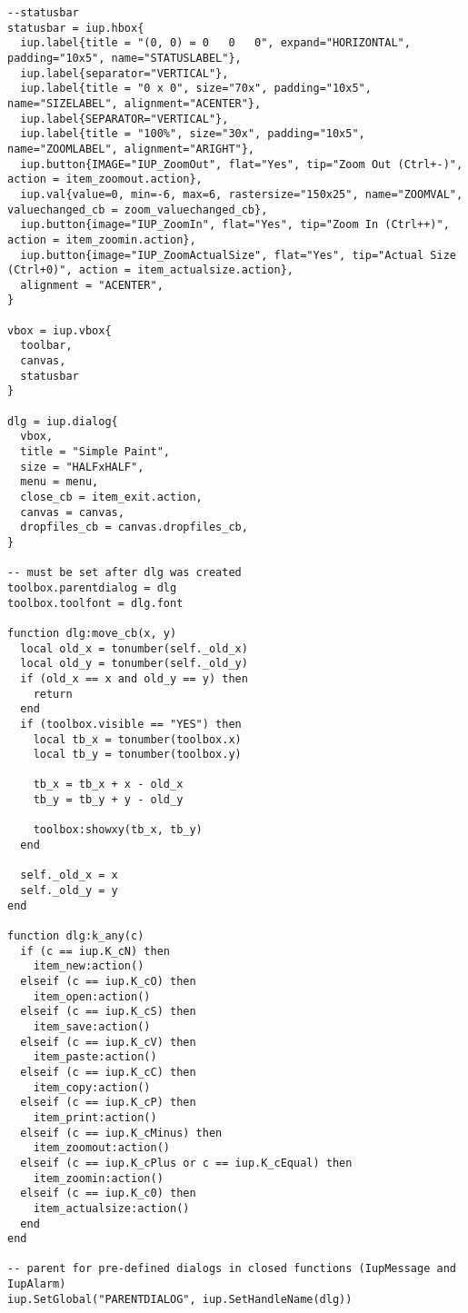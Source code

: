 \documentclass{ctexart}
\begin{document}
\begin{lstlisting}
--statusbar
statusbar = iup.hbox{
  iup.label{title = "(0, 0) = 0   0   0", expand="HORIZONTAL", padding="10x5", name="STATUSLABEL"},
  iup.label{separator="VERTICAL"},
  iup.label{title = "0 x 0", size="70x", padding="10x5", name="SIZELABEL", alignment="ACENTER"},
  iup.label{SEPARATOR="VERTICAL"},
  iup.label{title = "100%", size="30x", padding="10x5", name="ZOOMLABEL", alignment="ARIGHT"},
  iup.button{IMAGE="IUP_ZoomOut", flat="Yes", tip="Zoom Out (Ctrl+-)", action = item_zoomout.action},
  iup.val{value=0, min=-6, max=6, rastersize="150x25", name="ZOOMVAL", valuechanged_cb = zoom_valuechanged_cb},
  iup.button{image="IUP_ZoomIn", flat="Yes", tip="Zoom In (Ctrl++)", action = item_zoomin.action},
  iup.button{image="IUP_ZoomActualSize", flat="Yes", tip="Actual Size (Ctrl+0)", action = item_actualsize.action},
  alignment = "ACENTER",
}

vbox = iup.vbox{
  toolbar,
  canvas,
  statusbar
}

dlg = iup.dialog{
  vbox,
  title = "Simple Paint",
  size = "HALFxHALF",
  menu = menu,
  close_cb = item_exit.action,
  canvas = canvas,
  dropfiles_cb = canvas.dropfiles_cb,
}

-- must be set after dlg was created
toolbox.parentdialog = dlg
toolbox.toolfont = dlg.font

function dlg:move_cb(x, y)
  local old_x = tonumber(self._old_x)
  local old_y = tonumber(self._old_y)
  if (old_x == x and old_y == y) then
    return
  end
  if (toolbox.visible == "YES") then
    local tb_x = tonumber(toolbox.x)
    local tb_y = tonumber(toolbox.y)

    tb_x = tb_x + x - old_x
    tb_y = tb_y + y - old_y

    toolbox:showxy(tb_x, tb_y)
  end

  self._old_x = x
  self._old_y = y
end

function dlg:k_any(c)
  if (c == iup.K_cN) then
    item_new:action()
  elseif (c == iup.K_cO) then
    item_open:action()
  elseif (c == iup.K_cS) then
    item_save:action()
  elseif (c == iup.K_cV) then
    item_paste:action()  
  elseif (c == iup.K_cC) then
    item_copy:action()  
  elseif (c == iup.K_cP) then
    item_print:action()  
  elseif (c == iup.K_cMinus) then
    item_zoomout:action()  
  elseif (c == iup.K_cPlus or c == iup.K_cEqual) then
    item_zoomin:action()  
  elseif (c == iup.K_c0) then
    item_actualsize:action()  
  end
end

-- parent for pre-defined dialogs in closed functions (IupMessage and IupAlarm)
iup.SetGlobal("PARENTDIALOG", iup.SetHandleName(dlg))


\end{lstlisting}
\end{document}
